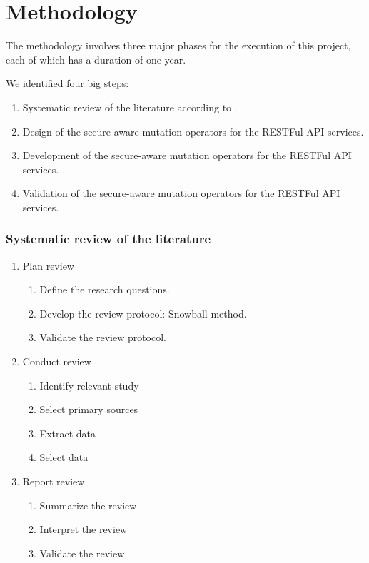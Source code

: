 \chapter{Methodology}

The methodology involves three major phases for the execution of this project, each of which has a duration of one year.

  We identified four big steps: 
  \begin{enumerate}
    \item Systematic review of the literature according to \cite{Kitchenham2002}.
    \item Design of the secure-aware mutation operators for the RESTFul API services.
    \item Development of the secure-aware mutation operators for the RESTFul API services.
    \item Validation of the secure-aware mutation operators for the RESTFul API services.
\end{enumerate}

\subsection{Systematic review of the literature}
  \begin{enumerate}
    \item Plan review
      \begin{enumerate}
 e        \item Define the research questions. 
        \item Develop the review protocol: Snowball method. 
        \item Validate the review protocol. 
      \end{enumerate}
    \item Conduct review
      \begin{enumerate}
        \item Identify relevant study
        \item Select primary sources
        \item Extract data
        \item Select data
      \end{enumerate}
    \item Report review
      \begin{enumerate}
        \item Summarize the review
        \item Interpret the review
        \item Validate the review
      \end{enumerate}
    \end{enumerate}
